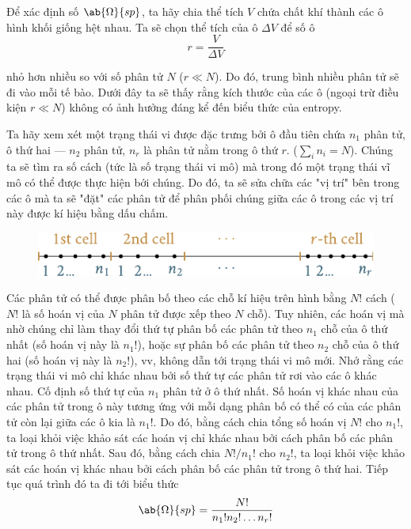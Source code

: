 Để xác định số $ \ab{\Omega}{sp}$, ta hãy chia thể tích $V$ chứa chất khí thành các ô hình khối giống hệt nhau. Ta sẽ chọn thể tích của ô $\Delta V$ để số ô
\begin{equation}\label{công thức:11_97}
	r = \frac{V}{\Delta V}
\end{equation}

\noindent
nhỏ hơn nhiều so với số phân tử $N$ ($ r\ll N $). Do đó, trung bình nhiều phân tử sẽ đi vào mỗi tế bào. Dưới đây ta sẽ thấy rằng kích thước của các ô (ngoại trừ điều kiện $r\ll N $) không có ảnh hưởng đáng kể đến biểu thức của entropy.

Ta hãy xem xét một trạng thái vi được đặc trưng bởi ô đầu tiên chứa $ n_1 $ phân tử, ô thứ hai --- $ n_2 $ phân tử, $ n_r $ là phân tử nằm trong ô thứ $ r $. ($ \sum_in_i = N $). Chúng ta sẽ tìm ra số cách (tức là số trạng thái vi mô) mà trong đó một trạng thái vĩ mô có thể được thực hiện bới chúng. Do đó, ta sẽ sửa chữa các "vị trí" bên trong các ô mà ta sẽ "đặt" các phân tử để phân phối chúng giữa các ô trong  các vị trí này được kí hiệu bằng dấu chấm.

\begin{figure}[!htb]
	\begin{center}
		\includegraphics[scale=1.0]{figures/ch_11/fig_11_26.pdf}
		\caption[]{}
		\label{fig:11_26}
	\end{center}
	\vspace{-0.8cm}
\end{figure}

    Các phân tử có thể được phân bố theo các chỗ kí hiệu trên hình  bằng $N!$ cách ($N!$ là số hoán vị của $N$ phân tử được xếp theo $N$ chỗ). Tuy nhiên, các hoán vị mà nhờ chúng chỉ làm thay đổi thứ tự phân bố các phân tử theo $n_1$ chỗ của ô thứ nhất (số hoán vị này là $n_1!$), hoặc sự phân bố các phân tử theo $n_2$ chỗ của ô thứ hai (số hoán vị này là $n_2!$), vv, không dẫn tới trạng thái vi mô mới. Nhớ rằng các trạng thái vi mô chỉ khác nhau bởi số thứ tự các phân tử rơi vào các ô khác nhau. Cố định số thứ tự của $n_1$ phân tử ở ô thứ nhất. Số hoán vị khác nhau của các phân tử trong ô này tương ứng với mỗi dạng phân bố có thể có của các phân tử còn lại giữa các ô kia là $n_1!$. Do đó, bằng cách chia tổng số hoán vị $N!$ cho $n_1!$, ta loại khỏi việc khảo sát các hoán vị chỉ khác nhau bởi cách phân bố các phân tử trong ô thứ nhất. Sau đó, bằng cách chia $N!/n_1!$ cho $n_2!$, ta loại khỏi việc khảo sát các hoán vị khác nhau bởi cách phân bố các phân tử trong ô thứ hai. Tiếp tục quá trình đó ta đi tới biểu thức
\begin{equation}\label{công thức:11_98}
	\ab{\Omega}{sp} = \frac{N!}{n_1! n_2! \ldots n_r!}
\end{equation}

